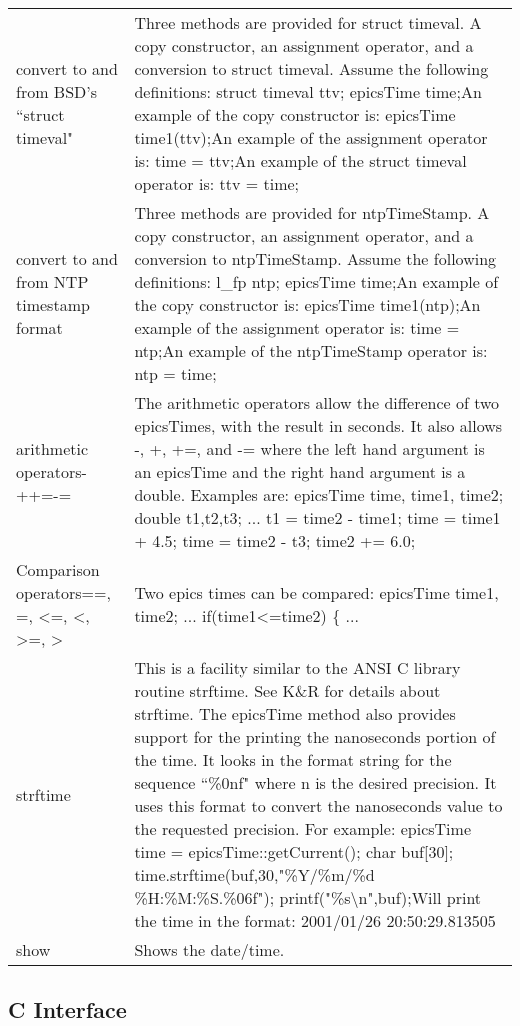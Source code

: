 \begin{center}
\begin{longtable}{p{1.95833in}p{4.79167in}}
convert to and from BSD's ``struct timeval" & Three methods are provided for struct timeval. A copy constructor, an assignment operator, and a conversion to struct timeval. Assume the following definitions:    struct timeval ttv;    epicsTime time;An example of the copy constructor is:    epicsTime time1(ttv);An example of the assignment operator is:    time = ttv;An example of the struct timeval operator is:    ttv = time;\\
convert to and from NTP timestamp format & Three methods are provided for ntpTimeStamp. A copy constructor, an assignment operator, and a conversion to ntpTimeStamp. Assume the following definitions:    l\_fp ntp;    epicsTime time;An example of the copy constructor is:    epicsTime time1(ntp);An example of the assignment operator is:    time = ntp;An example of the ntpTimeStamp operator is:    ntp = time;\\
arithmetic operators- ++=-= & The arithmetic operators allow the difference of two epicsTimes, with the result in seconds. It also allows -, +, +=, and -= where the left hand argument is an epicsTime and the right hand argument is a double. Examples are:    epicsTime time, time1, time2;    double t1,t2,t3;    ...    t1 = time2 - time1;    time = time1 + 4.5;    time = time2 - t3;    time2 += 6.0;\\
Comparison operators==, \textbar{}=, \textless{}=, \textless{}, \textgreater{}=, \textgreater{} & Two epics times can be compared:    epicsTime time1, time2;    ...    if(time1\textless{}=time2) \{ ...\\
strftime & This is a facility similar to the ANSI C library routine strftime. See K\&R for details about strftime. The epicsTime method also provides support for the printing the nanoseconds portion of the time. It looks in the format string for the sequence ``\%0nf" where n is the desired precision. It uses this format to convert the nanoseconds value to the requested precision. For example:    epicsTime time = epicsTime::getCurrent();    char buf[30];    time.strftime(buf,30,"\%Y/\%m/\%d \%H:\%M:\%S.\%06f");    printf("\%s\textbackslash{}n",buf);Will print the time in the format:    2001/01/26 20:50:29.813505\\
show & Shows the date/time.
\end{longtable}

\end{center}


\subsection{C Interface}

